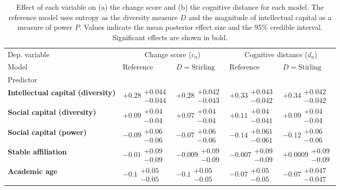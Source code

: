 \begin{table}[H]
\caption{Effect of each variable on (a) the change score and (b) the cognitive distance for each model. The reference model uses entropy as the diversity measure $D$ and the magnitude of intellectual capital as a measure of power $P$. Values indicate the mean posterior effect size and the 95\% credible interval. Significant effects are shown in bold.}
\label{table:summary_change_disruption}
\renewcommand{\arraystretch}{2}\fontsize{6}{7}\selectfont\begin{tabular}{lllll}
\toprule
Dep. variable & \multicolumn{2}{c}{Change score ($c_a$)} & \multicolumn{2}{c}{Cognitive distance ($d_a$)} \\
Model & Reference & $D=\text{Stirling}$ & Reference & $D=\text{Stirling}$ \\
Predictor &  &  &  &  \\
\midrule
\textbf{Intellectual capital (diversity)} & $\bm{+0.28}\substack{+0.044 \\ -0.044}$ & $\bm{+0.28}\substack{+0.042 \\ -0.043}$ & $\bm{+0.33}\substack{+0.043 \\ -0.042}$ & $\bm{+0.34}\substack{+0.042 \\ -0.042}$ \\
\textbf{Social capital (diversity)} & $\bm{+0.09}\substack{+0.04 \\ -0.04}$ & $\bm{+0.07}\substack{+0.04 \\ -0.04}$ & $\bm{+0.11}\substack{+0.04 \\ -0.041}$ & $\bm{+0.09}\substack{+0.04 \\ -0.04}$ \\
\textbf{Social capital (power)} & $\bm{-0.09}\substack{+0.06 \\ -0.06}$ & $\bm{-0.07}\substack{+0.06 \\ -0.06}$ & $\bm{-0.14}\substack{+0.061 \\ -0.061}$ & $\bm{-0.12}\substack{+0.06 \\ -0.06}$ \\
\textbf{Stable affiliation} & $-0.01\substack{+0.09 \\ -0.09}$ & $-0.009\substack{+0.09 \\ -0.09}$ & $-0.007\substack{+0.09 \\ -0.09}$ & $+0.0009\substack{+0.09 \\ -0.09}$ \\
\textbf{Academic age} & $\bm{-0.1}\substack{+0.05 \\ -0.05}$ & $\bm{-0.1}\substack{+0.05 \\ -0.05}$ & $\bm{-0.07}\substack{+0.05 \\ -0.05}$ & $\bm{-0.07}\substack{+0.047 \\ -0.047}$ \\

\end{tabular}
\end{table}
